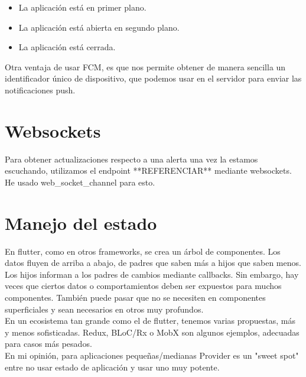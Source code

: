 \begin{itemize}
	\item La aplicación está en primer plano.
	\item La aplicación está abierta en segundo plano.
	\item La aplicación está cerrada.
\end{itemize}


Otra ventaja de usar FCM, es que nos permite obtener de manera sencilla un identificador único de dispositivo, que podemos usar en el servidor para enviar las notificaciones push.

\section{Websockets}

Para obtener actualizaciones respecto a una alerta una vez la estamos escuchando, utilizamos el endpoint **REFERENCIAR** mediante websockets.
He usado web\_socket\_channel para esto.

\section{Manejo del estado}
En flutter, como en otros frameworks, se crea un árbol de componentes.
Los datos fluyen de arriba a abajo, de padres que saben más a hijos que saben
menos. Los hijos informan a los padres de cambios mediante callbacks.
Sin embargo, hay veces que ciertos datos o comportamientos deben ser
expuestos para muchos componentes. También puede pasar que no se necesiten
en componentes superficiales y sean necesarios en otros muy profundos. \\
En un ecosistema tan grande como el de flutter, tenemos varias propuestas, más y
menos sofisticadas. Redux, BLoC/Rx o MobX son algunos ejemplos, adecuadas
para casos más pesados.\\
En mi opinión, para aplicaciones pequeñas/medianas Provider es un "sweet spot"
entre no usar estado de aplicación y usar uno muy potente. 
